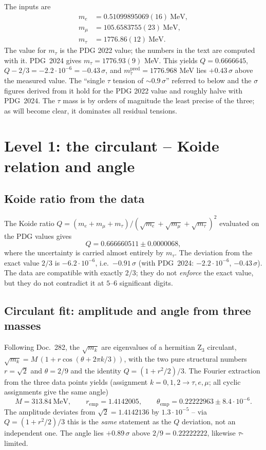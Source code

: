 The inputs are
\begin{align}
  m_e    &= 0.51099895069(16)\ \text{MeV},\\
  m_\mu  &= 105.6583755(23)\ \text{MeV},\\
  m_\tau &= 1776.86(12)\ \text{MeV}.
\end{align}
The value for $m_\tau$ is the PDG 2022 value; the numbers in the text are
computed with it. PDG~2024 gives $m_\tau=1776.93(9)$ MeV. This yields
$Q=0.6666645$, $Q-2/3=-2.2\cdot10^{-6}=-0.43\,\sigma$, and
$m_\tau^{\text{pred}}=1776.968$ MeV lies $+0.43\,\sigma$ above the measured
value. The \enquote{single $\tau$ tension of $\sim0.9\,\sigma$} referred to
below and the $\sigma$ figures derived from it hold for the PDG 2022 value and
roughly halve with PDG~2024.
The $\tau$ mass is by orders of magnitude the least precise of the three; as
will become clear, it dominates all residual tensions.

\section{Level 1: the circulant -- Koide relation and angle}

\subsection{Koide ratio from the data}
The Koide ratio
$Q=(m_e+m_\mu+m_\tau)/(\sqrt{m_e}+\sqrt{m_\mu}+\sqrt{m_\tau})^2$ evaluated on
the PDG values gives
\begin{equation}
  Q = 0.666660511 \pm 0.0000068,
\end{equation}
where the uncertainty is carried almost entirely by $m_\tau$. The deviation
from the exact value $2/3$ is $-6.2\cdot10^{-6}$, i.e.\ $-0.91\,\sigma$
(with PDG~2024: $-2.2\cdot10^{-6}$, $-0.43\,\sigma$). The
data are compatible with exactly $2/3$; they do not \emph{enforce} the exact
value, but they do not contradict it at $5$--$6$ significant digits.

\subsection{Circulant fit: amplitude and angle from three masses}
Following Doc.~282, the $\sqrt{m_k}$ are eigenvalues of a hermitian
Z$_3$ circulant, $\sqrt{m_k}=M\,(1+r\cos(\theta+2\pi k/3))$, with the two
pure structural numbers $r=\sqrt2$ and $\theta=2/9$ and the identity
$Q=(1+r^2/2)/3$. The Fourier extraction from the three data points yields
(assignment $k=0,1,2\to\tau,e,\mu$; all cyclic assignments give the same
angle)
\begin{equation}
  M = 313.84\ \text{MeV},\qquad
  r_{\text{emp}} = 1.4142005,\qquad
  \theta_{\text{emp}} = 0.22222963 \pm 8.4\cdot10^{-6}.
\end{equation}
The amplitude deviates from $\sqrt2=1.4142136$ by $1.3\cdot10^{-5}$ -- via
$Q=(1+r^2/2)/3$ this is the \emph{same} statement as the $Q$ deviation, not
an independent one. The angle lies $+0.89\,\sigma$ above
$2/9=0.22222222$, likewise $\tau$-limited.

